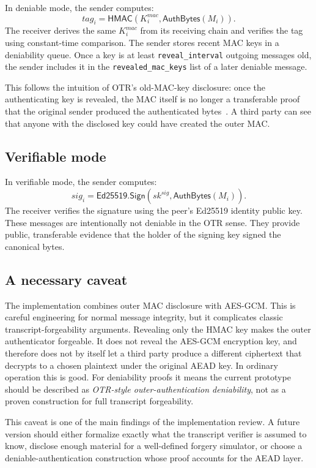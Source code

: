 \documentclass[11pt]{article}
\newcommand{\HMAC}{\mathsf{HMAC}}
\begin{document}
In deniable mode, the sender computes:
\[
  tag_i = \HMAC(K^{mac}_i, \mathsf{AuthBytes}(M_i)).
\]
The receiver derives the same $K^{mac}_i$ from its receiving chain and verifies the tag using constant-time comparison. The sender stores recent MAC keys in a deniability queue. Once a key is at least \texttt{reveal\_interval} outgoing messages old, the sender includes it in the \texttt{revealed\_mac\_keys} list of a later deniable message.

This follows the intuition of OTR's old-MAC-key disclosure: once the authenticating key is revealed, the MAC itself is no longer a transferable proof that the original sender produced the authenticated bytes~\cite{otr_v3}. A third party can see that anyone with the disclosed key could have created the outer MAC.

\subsection{Verifiable mode}

In verifiable mode, the sender computes:
\[
  sig_i = \mathsf{Ed25519.Sign}(sk^{sig}, \mathsf{AuthBytes}(M_i)).
\]
The receiver verifies the signature using the peer's Ed25519 identity public key. These messages are intentionally not deniable in the OTR sense. They provide public, transferable evidence that the holder of the signing key signed the canonical bytes.

\subsection{A necessary caveat}

The implementation combines outer MAC disclosure with AES-GCM. This is careful engineering for normal message integrity, but it complicates classic transcript-forgeability arguments. Revealing only the HMAC key makes the outer authenticator forgeable. It does not reveal the AES-GCM encryption key, and therefore does not by itself let a third party produce a different ciphertext that decrypts to a chosen plaintext under the original AEAD key. In ordinary operation this is good. For deniability proofs it means the current prototype should be described as \emph{OTR-style outer-authentication deniability}, not as a proven construction for full transcript forgeability.

This caveat is one of the main findings of the implementation review. A future version should either formalize exactly what the transcript verifier is assumed to know, disclose enough material for a well-defined forgery simulator, or choose a deniable-authentication construction whose proof accounts for the AEAD layer.
\end{document}
